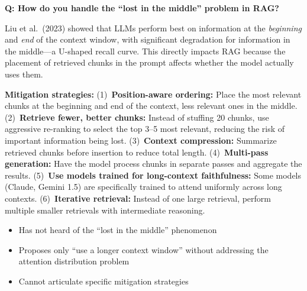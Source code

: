 \begin{interviewq}
\end{interviewq}

\bigskip

\begin{interviewq}
\textbf{Q: How do you handle the ``lost in the middle'' problem in RAG?}

 \quad {} \quad \badgefreq{\freqmed}

\stronganswer
Liu et al.\ (2023) showed that LLMs perform best on information at the
\emph{beginning} and \emph{end} of the context window, with significant
degradation for information in the middle---a U-shaped recall curve.  This
directly impacts RAG because the placement of retrieved chunks in the prompt
affects whether the model actually uses them.

\textbf{Mitigation strategies:}
(1)~\textbf{Position-aware ordering:} Place the most relevant chunks at the
beginning and end of the context, less relevant ones in the middle.
(2)~\textbf{Retrieve fewer, better chunks:} Instead of stuffing 20 chunks,
use aggressive re-ranking to select the top 3--5 most relevant, reducing the
risk of important information being lost.  (3)~\textbf{Context compression:}
Summarize retrieved chunks before insertion to reduce total length.
(4)~\textbf{Multi-pass generation:} Have the model process chunks in separate
passes and aggregate the results.  (5)~\textbf{Use models trained for
long-context faithfulness:} Some models (Claude, Gemini 1.5) are specifically
trained to attend uniformly across long contexts.
(6)~\textbf{Iterative retrieval:} Instead of one large retrieval, perform
multiple smaller retrievals with intermediate reasoning.

\redflags
\begin{itemize}
    \item Has not heard of the ``lost in the middle'' phenomenon
    \item Proposes only ``use a longer context window'' without addressing the
          attention distribution problem
    \item Cannot articulate specific mitigation strategies
\end{itemize}



\end{interviewq}
